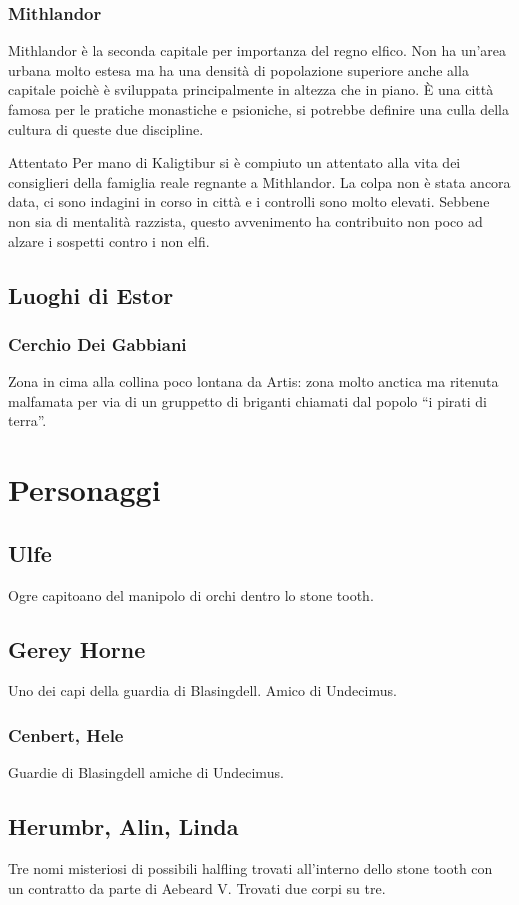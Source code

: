 \documentclass[10pt,twoside,twocolumn]{article}
\begin{document}
\subsubsection{Mithlandor}\label{cyt:mithlandor}
Mithlandor \`e la seconda capitale per importanza del regno elfico. Non ha
un'area urbana molto estesa ma ha una densit\`a di popolazione superiore anche alla
capitale poich\`e \`e sviluppata principalmente in altezza che in piano.
\`E una citt\`a famosa per le pratiche monastiche e psioniche, si potrebbe definire
una culla della cultura di queste due discipline.
\begin{commentbox}{Attentato}
  Per mano di Kaligtibur si \`e compiuto un attentato alla vita dei consiglieri della
  famiglia reale regnante a Mithlandor. La colpa non \`e stata ancora data, ci sono
  indagini in corso in citt\`a e i controlli sono molto elevati. Sebbene non sia di
  mentalit\`a razzista, questo avvenimento ha contribuito non poco ad alzare
  i sospetti contro i non elfi.
\end{commentbox}
\subsection{Luoghi di Estor}
\subsubsection{Cerchio Dei Gabbiani}
Zona in cima alla collina poco lontana da Artis: zona molto anctica ma ritenuta
malfamata per via di un gruppetto di briganti chiamati dal popolo ``i pirati
di terra''.
\section{Personaggi}
\subsection{Ulfe}\label{char:ulfe}
Ogre capitoano del manipolo di orchi dentro lo stone tooth.
\subsection{Gerey Horne}
Uno dei capi della guardia di Blasingdell. Amico di Undecimus.
\subsubsection{Cenbert, Hele}\label{char:cenbert}
Guardie di Blasingdell amiche di Undecimus.
\subsection{Herumbr, Alin, Linda}\label{char:herumbr}
Tre nomi misteriosi di possibili halfling trovati all'interno
dello stone tooth con un contratto da parte di Aebeard V.
Trovati due corpi su tre.
\end{document}
